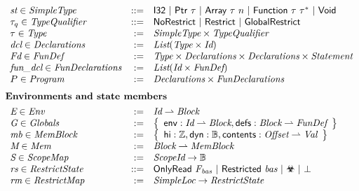 \begin{figure}[H]
\[{\begin{array}{lrl}
    \textdom{st} \in \Simpletype            & \bnfdef   & \Inttype \ | \ \Ptrtype  \ | \  \Arraytype \ | \ \Functiontype \ | \ \Voidtype  \\
    \tau_q \in \Typequalifier               & \bnfdef   & \Noqualifier \ | \ \Restrictqualifier \ | \ \Globalrestrictqualifier \\
    \tau \in \Type                          & :=        & \Simpletype \times \Typequalifier       \\ 
    \Dclvar \in \Declarations               & :=        & \List{\Type \times \Id}                        \\
    \Fundefvar \in \textdom{FunDef}         & :=        & \Type \times \Declarations \times \Declarations \times \Statement \\ %
    \Fundclvar \in \Fundeclarations         & :=        & \List{\Id \times \textdom{FunDef}} \\
    P \in \textdom{Program}                 & :=        & \Declarations \times \Fundeclarations   \\[6pt] %
\multicolumn{3}{l}{\hspace{-5pt}\textbf{Environments and state members}} \\[4pt]
    \Envvar \in \Env                        & :=        & \Id \rightharpoonup \Block                                                                  \\
    \text{$\Globalsvar \in \Globals$ } & := & \left\{
  \begin{array}{l}
    \Globalsmemberenv : \Id \rightharpoonup \Block, \Globalsmemberdefs : \Block \rightharpoonup \Fundef
  \end{array}
  \right\} \\
    \Memblockvar \in \Memblock                        & :=        &  \left\{
        \begin{array}{l}
        \Memblockmemberhi: \Intdomain, \Memblockmemberdyn : \Booldomain, \Memblockmembercontent : \Offset \rightharpoonup \Val
        \end{array}
        \right\} \\
    \Memvar \in \Mem                        & :=        & \Block \rightharpoonup \Memblock                           \\
    \Scopemapvar \in \Scopemap              & :=        & \Scopeid \to \Booldomain \\
    \Restrictstatevar \in \Restrictstate    & \bnfdef   & \onlyread{\Basesfamvar} \ | \ \restricted{\Basesvar} \ | \ \rsub \ | \ \bot                                \\
    \Restrictmapvar \in \Restrictmap        & :=        & \Simpleloc \to \Restrictstate  \\


\end{array}}\]
\end{figure}
